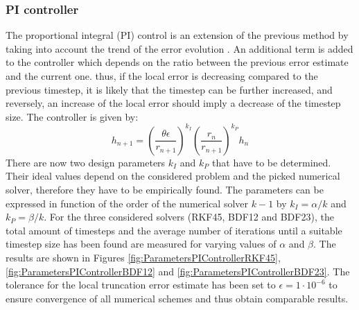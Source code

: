 \subsubsection{PI controller}
The proportional integral (PI) control is an extension of the previous method by taking into account the trend of the error evolution \cite{AutomControlAdaptTS}. An additional term is added to the controller which depends on the ratio between the previous error estimate and the current one. thus, if the local error is decreasing compared to the previous timestep, it is likely that the timestep can be further increased, and reversely, an increase of the local error should imply a decrease of the timestep size. The controller is given by:
\begin{equation}
h_{n+1} = \left(\frac{\theta\epsilon}{r_{n+1}}\right)^{k_I} \left(\frac{r_n}{r_{n+1}}\right)^{k_P} h_n 
\end{equation}
There are now two design parameters $k_I$ and $k_P$ that have to be determined. Their ideal values depend on the considered problem and the picked numerical solver, therefore they have to be empirically found. The parameters can be expressed in function of the order of the numerical solver $k-1$ by $k_I = \alpha / k$ and $k_P = \beta / k$. For the three considered solvers (RKF45, BDF12 and BDF23), the total amount of timesteps and the average number of iterations until a suitable timestep size has been found are measured for varying values of $\alpha$ and $\beta$. The results are shown in Figures \ref{fig:ParametersPIControllerRKF45},  \ref{fig:ParametersPIControllerBDF12} and  \ref{fig:ParametersPIControllerBDF23}. The tolerance for the local truncation error estimate has been set to $\epsilon=1\cdot 10^{-6}$ to ensure convergence of all numerical schemes and thus obtain comparable results. 
